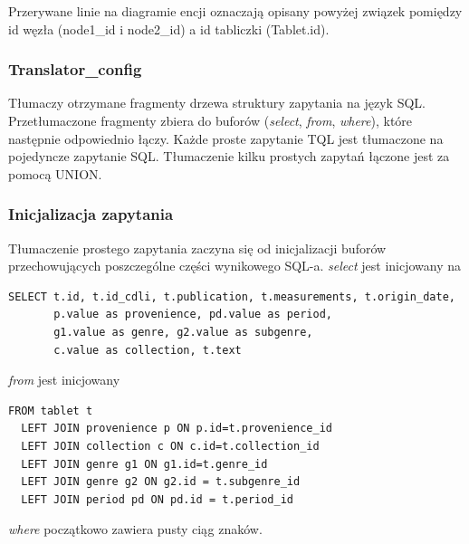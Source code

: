 \documentclass{pracamgr}
\begin{document}
Przerywane linie na diagramie encji oznaczają opisany powyżej związek pomiędzy id węzła (node1\_id i node2\_id) 
a id tabliczki (Tablet.id).


 

\subsubsection{Translator\_config}
Tłumaczy otrzymane fragmenty drzewa struktury zapytania na język SQL. Przetłumaczone fragmenty zbiera do buforów 
(\textit{select}, \textit{from}, \textit{where}), które następnie odpowiednio łączy.
Każde proste zapytanie TQL jest tłumaczone na pojedyncze zapytanie SQL. Tłumaczenie kilku prostych zapytań
łączone jest za pomocą UNION.

\subsubsection{Inicjalizacja zapytania}
Tłumaczenie prostego zapytania zaczyna się od inicjalizacji buforów przechowujących poszczególne części wynikowego SQL-a.
\textit{select} jest inicjowany na 
\begin{verbatim}
SELECT t.id, t.id_cdli, t.publication, t.measurements, t.origin_date, 
       p.value as provenience, pd.value as period,
       g1.value as genre, g2.value as subgenre, 
       c.value as collection, t.text
\end{verbatim}
\textit{from} jest inicjowany
\begin{verbatim}
FROM tablet t
  LEFT JOIN provenience p ON p.id=t.provenience_id
  LEFT JOIN collection c ON c.id=t.collection_id
  LEFT JOIN genre g1 ON g1.id=t.genre_id
  LEFT JOIN genre g2 ON g2.id = t.subgenre_id
  LEFT JOIN period pd ON pd.id = t.period_id
\end{verbatim}
\textit{where} początkowo zawiera pusty ciąg znaków.
\end{document}
